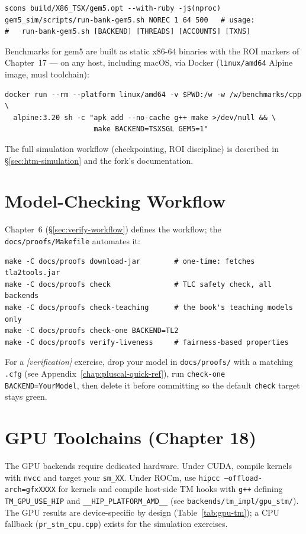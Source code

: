 \begin{verbatim}
scons build/X86_TSX/gem5.opt --with-ruby -j$(nproc)
gem5_sim/scripts/run-bank-gem5.sh NOREC 1 64 500   # usage:
#   run-bank-gem5.sh [BACKEND] [THREADS] [ACCOUNTS] [TXNS]
\end{verbatim}

Benchmarks for gem5 are built as static x86-64 binaries with the ROI
markers of Chapter~17 --- on any host, including macOS, via Docker
(\texttt{linux/amd64} Alpine image, musl toolchain):

\begin{verbatim}
docker run --rm --platform linux/amd64 -v $PWD:/w -w /w/benchmarks/cpp \
  alpine:3.20 sh -c "apk add --no-cache g++ make >/dev/null && \
                     make BACKEND=TSXSGL GEM5=1"
\end{verbatim}

The full simulation workflow (checkpointing, ROI discipline) is described in \S\ref{sec:htm-simulation} and the fork's documentation.

\section{Model-Checking Workflow}

Chapter~6 (\S\ref{sec:verify-workflow}) defines the workflow; the
\texttt{docs/proofs/Makefile} automates it:

\begin{verbatim}
make -C docs/proofs download-jar        # one-time: fetches tla2tools.jar
make -C docs/proofs check               # TLC safety check, all backends
make -C docs/proofs check-teaching      # the book's teaching models only
make -C docs/proofs check-one BACKEND=TL2
make -C docs/proofs verify-liveness     # fairness-based properties
\end{verbatim}

For a \emph{[verification]} exercise, drop your model in
\texttt{docs/proofs/} with a matching \texttt{.cfg} (see
Appendix~\ref{chap:pluscal-quick-ref}), run \texttt{check-one
BACKEND=YourModel}, then delete it before committing so the default
\texttt{check} target stays green.

\section{GPU Toolchains (Chapter 18)}

The GPU backends require dedicated hardware.  Under CUDA, compile kernels
with \texttt{nvcc} and target your \texttt{sm\_XX}.  Under ROCm, use
\texttt{hipcc --offload-arch=gfxXXXX} for kernels and compile host-side TM
hooks with \texttt{g++} defining \texttt{TM\_GPU\_USE\_HIP} and
\texttt{\_\_HIP\_PLATFORM\_AMD\_\_} (see
\texttt{backends/tm\_impl/gpu\_stm/}).  The GPU results are device-specific
by design (Table~\ref{tab:gpu-tm}); a CPU fallback
(\texttt{pr\_stm\_cpu.cpp}) exists for the simulation exercises.

